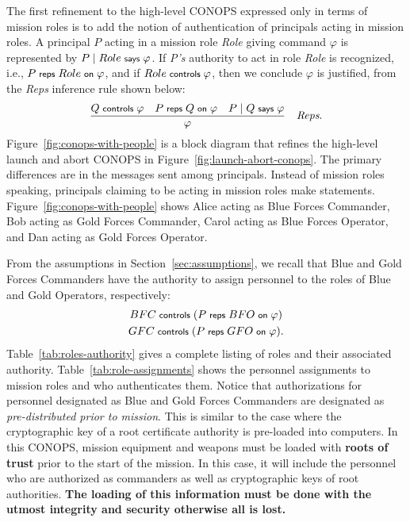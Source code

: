 \documentclass[10pt,twoside]{article}
\renewcommand{\infname}[1]{\textit{#1}}
\renewcommand{\irule}[3]
    {\ensuremath{{\displaystyle \frac{#1}{#2}}\quad \infname{#3}}}
\begin{document}
The first refinement to the high-level CONOPS expressed only in terms
of mission roles is to add the notion of authentication of principals
acting in mission roles. A principal $P$ acting in a mission role
\emph{Role} giving command $\varphi$ is represented by $P \;|\;
Role \text{\footnotesize \textsf{ says }} \varphi$. If \emph{P's} authority to act in role
\emph{Role} is recognized, i.e., ${P} \text{\footnotesize \textsf{ reps }}{Role}{\text{\footnotesize \textsf{ on }}}{\varphi}$, and if
$Role \text{\footnotesize \textsf{ controls }} \varphi$, then we conclude $\varphi$ is justified,
from the \emph{Reps} inference rule shown below:
\begin{gather*}
  \irule
  {Q \controls \varphi \quad \reps{P}{Q}{\varphi} \quad 
   P \quoting Q \says \varphi}
  {\varphi}
  {Reps}.
\end{gather*}
Figure~\ref{fig:conops-with-people} is a block diagram that refines
the high-level launch and abort CONOPS in
Figure~\ref{fig:launch-abort-conops}.  The primary differences are in
the messages sent among principals. Instead of mission roles speaking,
principals claiming to be acting in mission roles make
statements. Figure~\ref{fig:conops-with-people} shows Alice acting as
Blue Forces Commander, Bob acting as Gold Forces Commander, Carol
acting as Blue Forces Operator, and Dan acting as Gold Forces
Operator.

From the assumptions in Section~\ref{sec:assumptions}, we recall that
Blue and Gold Forces Commanders have the authority to assign personnel
to the roles of Blue and Gold Operators, respectively:
\begin{gather*}
  BFC \text{\footnotesize \textsf{ controls }} ({P} \text{\footnotesize \textsf{ reps }}{BFO}{\text{\footnotesize \textsf{ on }}}{\varphi})\\
  GFC \text{\footnotesize \textsf{ controls }} ({P} \text{\footnotesize \textsf{ reps }}{GFO}{\text{\footnotesize \textsf{ on }}}{\varphi}).
\end{gather*}
Table~\ref{tab:roles-authority} gives a complete listing of roles and
their associated authority. Table~\ref{tab:role-assignments} shows the
personnel assignments to mission roles and who authenticates them.
Notice that authorizations for personnel designated as Blue and Gold
Forces Commanders are designated as \emph{pre-distributed prior to
  mission}. This is similar to the case where the cryptographic key of
a root certificate authority is pre-loaded into computers. In this
CONOPS, mission equipment and weapons must be loaded with
\textbf{roots of trust} prior to the start of the mission. In this
case, it will include the personnel who are authorized as commanders
as well as cryptographic keys of root authorities. \textbf{The loading
  of this information must be done with the utmost integrity and
  security otherwise all is lost.}
\end{document}
